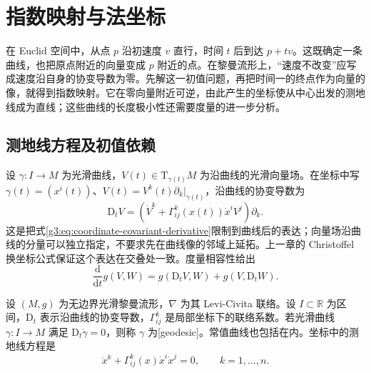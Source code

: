 
% 
% 

\section{指数映射与法坐标}
\label{g3:sec:0201}

在 Euclid 空间中，从点 \(p\) 沿初速度 \(v\) 直行，时间 \(t\) 后到达 \(p+tv\)。这既确定一条曲线，也把原点附近的向量变成 \(p\) 附近的点。在黎曼流形上，“速度不改变”应写成速度沿自身的协变导数为零。先解这一初值问题，再把时间一的终点作为向量的像，就得到指数映射。它在零向量附近可逆，由此产生的坐标使从中心出发的测地线成为直线；这些曲线的长度极小性还需要度量的进一步分析。

\subsection{测地线方程及初值依赖}
\label{g3:subsec:0201:01}

设 \(\gamma:I\to M\) 为光滑曲线，\(V(t)\in\mathrm{T}_{\gamma(t)}M\) 为沿曲线的光滑向量场。在坐标中写 \(\gamma(t)=(x^i(t))\)、\(V(t)=V^k(t)\partial_k|_{\gamma(t)}\)，沿曲线的协变导数为
\begin{equation}\label{g3:eq:covariant-derivative-along-curve}
	\mathrm{D}_tV
	=\left(\dot V^k+\Gamma^k_{ij}(x(t))\dot x^iV^j\right)\partial_k.
\end{equation}
这是把式\eqref{g3:eq:coordinate-covariant-derivative}限制到曲线后的表达；向量场沿曲线的分量可以独立指定，不要求先在曲线像的邻域上延拓。上一章的 Christoffel 换坐标公式保证这个表达在交叠处一致。度量相容性给出
\[
	\frac{\mathrm{d}}{\mathrm{d}t}g(V,W)
	=g(\mathrm{D}_tV,W)+g(V,\mathrm{D}_tW).
\]

\begin{definition}\label{g3:def:geodesic}
	设 \((M,g)\) 为无边界光滑黎曼流形，\(\nabla\) 为其 Levi-Civita 联络。设 \(I\subset\mathbb R\) 为区间，\(\mathrm D_t\) 表示沿曲线的协变导数，\(\Gamma^k_{ij}\) 是局部坐标下的联络系数。若光滑曲线 \(\gamma:I\to M\) 满足 \(\mathrm{D}_t\dot\gamma=0\)，则称 \(\gamma\) 为[geodesic]。常值曲线也包括在内。坐标中的测地线方程是
	\begin{equation}\label{g3:eq:geodesic-equation}
		\ddot x^k+\Gamma^k_{ij}(x)\dot x^i\dot x^j=0,
		\qquad k=1,\ldots,n.
	\end{equation}
\end{definition}


